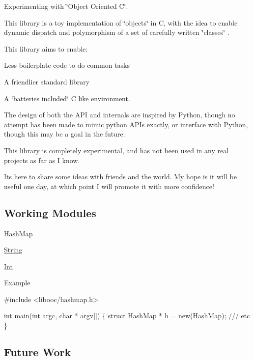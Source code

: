 Experimenting with \char`\"{}\+Object Oriented C\char`\"{}.

This library is a toy implementation of \char`\"{}objects\char`\"{} in C, with the idea to enable dynamic dispatch and polymorphism of a set of carefully written \char`\"{}classes\char`\"{} .

This library aims to enable\+:
\begin{DoxyItemize}
\item Less boilerplate code to do common tasks
\item A friendlier standard library
\item A \char`\"{}batteries included\char`\"{} C like environment.
\end{DoxyItemize}

The design of both the A\+PI and internals are inspired by Python, though no attempt has been made to mimic python A\+P\+Is exactly, or interface with Python, though this may be a goal in the future.

This library is completely experimental, and has not been used in any real projects as far as I know.

It\textquotesingle{}s here to share some ideas with friends and the world. My hope is it will be useful one day, at which point I will promote it with more confidence!

\subsection*{Working Modules}


\begin{DoxyItemize}
\item \mbox{\hyperlink{structHashMap}{Hash\+Map}}
\item \mbox{\hyperlink{structString}{String}}
\item \mbox{\hyperlink{structInt}{Int}}
\end{DoxyItemize}

Example 
\begin{DoxyCode}
#include <libooc/hashmap.h>

int main(int argc, char * argv[]) \{
    struct HashMap * h = new(HashMap);
    /// etc
\}
\end{DoxyCode}


\subsection*{Future Work}


